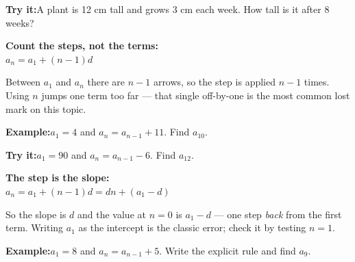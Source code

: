 \documentclass[12pt]{article}
\begin{document}
\begin{tryitbox}
\textbf{Try it:}\quad A plant is 12 cm tall and grows 3 cm each week. How tall
is it after 8 weeks?\\[2pt]
\end{tryitbox}


\begin{formulabox}
\textbf{Count the steps, not the terms:}\\[4pt]
$a_n = a_1 + (n-1)d$\par
\smallskip
Between $a_1$ and $a_n$ there are $n-1$ arrows, so the step is applied $n-1$
times. Using $n$ jumps one term too far --- that single off-by-one is the most
common lost mark on this topic.
\end{formulabox}

\begin{examplebox}
\textbf{Example:}\quad $a_1 = 4$ and $a_n = a_{n-1} + 11$. Find $a_{10}$.
\end{examplebox}

\begin{tryitbox}
\textbf{Try it:}\quad $a_1 = 90$ and $a_n = a_{n-1} - 6$. Find $a_{12}$.\\[2pt]
\end{tryitbox}


\begin{formulabox}
\textbf{The step is the slope:}\\[4pt]
$a_n = a_1 + (n-1)d = dn + (a_1 - d)$\par
\smallskip
So the slope is $d$ and the value at $n = 0$ is $a_1 - d$ --- one step
\emph{back} from the first term. Writing $a_1$ as the intercept is the classic
error; check it by testing $n = 1$.
\end{formulabox}

\begin{examplebox}
\textbf{Example:}\quad $a_1 = 8$ and $a_n = a_{n-1} + 5$. Write the explicit
rule and find $a_9$.
\end{examplebox}
\end{document}

